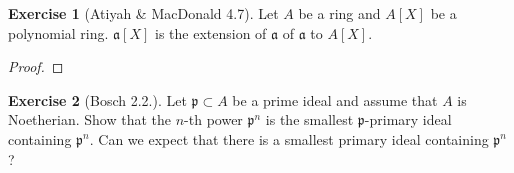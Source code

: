 \documentclass[a4paper]{book}
\theoremstyle{definition}
\newtheorem{exercise}{Exercise}[definition]
\begin{document}
\begin{exercise}[Atiyah \& MacDonald 4.7]
    Let \(A\) be a ring and \(A[X]\) be a polynomial ring. \(\mathfrak{a}[X]\) is the extension of \(\mathfrak{a}\) of \(\mathfrak{a}\) to \(A[X]\).
\end{exercise}
\begin{proof}
    
\end{proof}





\begin{exercise}[Bosch 2.2.]
    Let \(\mathfrak{p} \subset A\) be a prime ideal and assume that \(A\) is Noetherian. Show that the \(n\)-th power \(\mathfrak{p}^n\) is the smallest \(\mathfrak{p}\)-primary ideal containing \(\mathfrak{p}^n\). Can we expect that there is a smallest primary ideal containing \(\mathfrak{p}^n\)?
\end{exercise}
\end{document}
